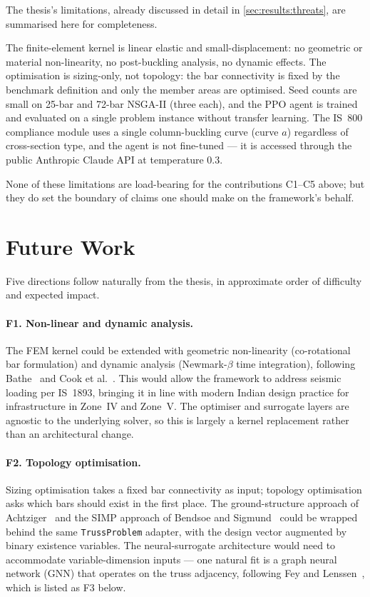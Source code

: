 The thesis's limitations, already discussed in detail in
\cref{sec:results:threats}, are summarised here for
completeness.

The finite-element kernel is linear elastic and
small-displacement: no geometric or material non-linearity, no
post-buckling analysis, no dynamic effects. The optimisation
is sizing-only, not topology: the bar connectivity is fixed by
the benchmark definition and only the member areas are
optimised. Seed counts are small on 25-bar and 72-bar NSGA-II
(three each), and the PPO agent is trained and evaluated on a
single problem instance without transfer learning. The IS~800
compliance module uses a single column-buckling curve (curve
$a$) regardless of cross-section type, and the agent is not
fine-tuned --- it is accessed through the public Anthropic
Claude API at temperature \num{0.3}.

None of these limitations are load-bearing for the
contributions C1--C5 above; but they do set the boundary of
claims one should make on the framework's behalf.

\section{Future Work}
\label{sec:conclusion:future}
\label{sec:concl:future}

Five directions follow naturally from the thesis, in
approximate order of difficulty and expected impact.

\paragraph{F1. Non-linear and dynamic analysis.} The FEM kernel
could be extended with geometric non-linearity (co-rotational
bar formulation) and dynamic analysis (Newmark-$\beta$ time
integration), following Bathe~\cite{bathe2014fem} and Cook et
al.~\cite{cook2002fem}. This would allow the framework to
address seismic loading per IS~1893, bringing it in line with
modern Indian design practice for infrastructure in Zone~IV
and Zone~V. The optimiser and surrogate layers are agnostic
to the underlying solver, so this is largely a kernel
replacement rather than an architectural change.

\paragraph{F2. Topology optimisation.} Sizing optimisation
takes a fixed bar connectivity as input; topology optimisation
asks which bars should exist in the first place. The
ground-structure approach of Achtziger~\cite{achtziger1999} and
the SIMP approach of Bendsoe and Sigmund~\cite{bendsoe2003topo}
could be wrapped behind the same \texttt{TrussProblem}
adapter, with the design vector augmented by binary existence
variables. The neural-surrogate architecture would need to
accommodate variable-dimension inputs --- one natural fit is a
graph neural network (GNN) that operates on the truss
adjacency, following Fey and Lenssen~\cite{fey2019gnn}, which is
listed as F3 below.

